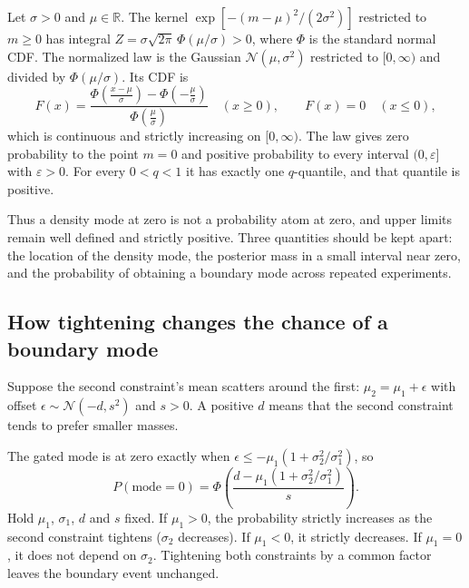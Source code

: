 \begin{proposition}\label{prop:law}
Let $\sigma>0$ and $\mu\in\mathbb{R}$. The kernel $\exp[-(m-\mu)^2/(2\sigma^2)]$ restricted to $m\ge0$ has integral $Z=\sigma\sqrt{2\pi}\,\Phi(\mu/\sigma)>0$, where $\Phi$ is the standard normal CDF. The normalized law is the Gaussian $\mathcal N(\mu,\sigma^2)$ restricted to $[0,\infty)$ and divided by $\Phi(\mu/\sigma)$. Its CDF is
\begin{equation}
  F(x)=\frac{\Phi\!\left(\frac{x-\mu}{\sigma}\right)-\Phi\!\left(-\frac{\mu}{\sigma}\right)}{\Phi\!\left(\frac{\mu}{\sigma}\right)}\quad(x\ge0),\qquad F(x)=0\quad(x\le0),
  \label{eq:gated_cdf}
\end{equation}
which is continuous and strictly increasing on $[0,\infty)$. The law gives zero probability to the point $m=0$ and positive probability to every interval $(0,\varepsilon]$ with $\varepsilon>0$. For every $0<q<1$ it has exactly one $q$-quantile, and that quantile is positive.
\end{proposition}

Thus a density mode at zero is not a probability atom at zero, and upper limits remain well defined and strictly positive. Three quantities should be kept apart: the location of the density mode, the posterior mass in a small interval near zero, and the probability of obtaining a boundary mode across repeated experiments.

\subsection{How tightening changes the chance of a boundary mode}
Suppose the second constraint's mean scatters around the first: $\mu_2=\mu_1+\epsilon$ with offset $\epsilon\sim\mathcal N(-d,s^2)$ and $s>0$. A positive $d$ means that the second constraint tends to prefer smaller masses.

\begin{proposition}\label{prop:sweep}
The gated mode is at zero exactly when $\epsilon\le-\mu_1\left(1+\sigma_2^2/\sigma_1^2\right)$, so
\begin{equation}
  P(\mathrm{mode}=0)=\Phi\!\left(\frac{d-\mu_1\left(1+\sigma_2^2/\sigma_1^2\right)}{s}\right).
  \label{eq:sweep_probability}
\end{equation}
Hold $\mu_1$, $\sigma_1$, $d$ and $s$ fixed. If $\mu_1>0$, the probability strictly increases as the second constraint tightens ($\sigma_2$ decreases). If $\mu_1<0$, it strictly decreases. If $\mu_1=0$, it does not depend on $\sigma_2$. Tightening both constraints by a common factor leaves the boundary event unchanged.
\end{proposition}

